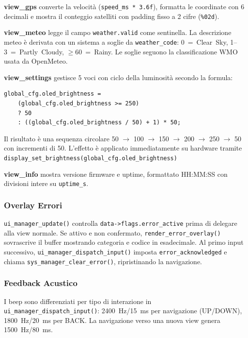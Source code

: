 \textbf{view\_gps} converte la velocità (\texttt{speed\_ms * 3.6f}),
formatta le coordinate con 6 decimali e mostra il conteggio satelliti con
padding fisso a 2 cifre (\texttt{\%02d}).

\textbf{view\_meteo} legge il campo \texttt{weather.valid} come sentinella.
La descrizione meteo è derivata con un sistema a soglie da \texttt{weather\_code}:
0~=~Clear~Sky, 1--3~=~Partly~Cloudy, $\geq$60~=~Rainy. Le soglie seguono
la classificazione WMO usata da OpenMeteo.

\textbf{view\_settings} gestisce 5 voci con ciclo della luminosità
secondo la formula:
\begin{lstlisting}
global_cfg.oled_brightness =
    (global_cfg.oled_brightness >= 250)
    ? 50
    : ((global_cfg.oled_brightness / 50) + 1) * 50;
\end{lstlisting}
Il risultato è una sequenza circolare 50 $\to$ 100 $\to$ 150 $\to$ 200
$\to$ 250 $\to$ 50 con incrementi di 50. L'effetto è applicato
immediatamente su hardware tramite
\texttt{display\_set\_brightness(global\_cfg.oled\_brightness)}

\textbf{view\_info} mostra versione firmware e uptime, formattato HH:MM:SS con divisioni intere su \texttt{uptime\_s}.

\subsubsection{Overlay Errori}

\texttt{ui\_manager\_update()} controlla \texttt{data->flags.error\_active}
prima di delegare alla view normale. Se attivo e non confermato,
\texttt{render\_error\_overlay()} sovrascrive il buffer mostrando categoria
e codice in esadecimale. Al primo input successivo,
\texttt{ui\_manager\_dispatch\_input()} imposta \texttt{error\_acknowledged}
e chiama \texttt{sys\_manager\_clear\_error()}, ripristinando la navigazione.


\subsubsection{Feedback Acustico}

I beep sono differenziati per tipo di interazione in
\texttt{ui\_manager\_dispatch\_input()}: 2400~Hz/15~ms per navigazione
(UP/DOWN), 1800~Hz/20~ms per BACK. La navigazione verso una nuova view
genera 1500~Hz/80~ms. 
 
